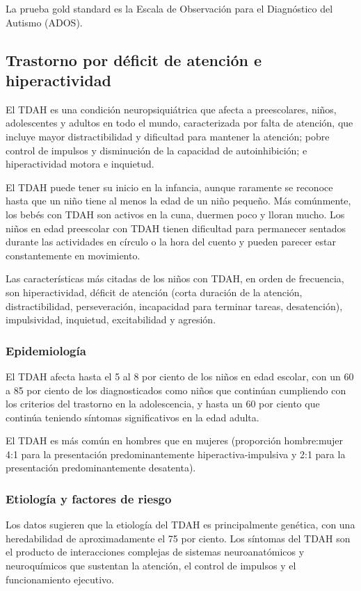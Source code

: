 \documentclass[11pt,letterpaper]{report}
\begin{document}
La prueba gold standard es la Escala de Observación para el Diagnóstico del
Autismo (ADOS). \cite{Koth2023}

\subsection{Trastorno por déficit de atención e hiperactividad}
El TDAH es una condición neuropsiquiátrica que afecta a preescolares, niños,
adolescentes y adultos en todo el mundo, caracterizada por falta de atención,
que incluye mayor distractibilidad y dificultad para mantener la atención;
pobre control de impulsos y disminución de la capacidad de autoinhibición; e
hiperactividad motora e inquietud. \cite{Boland2021-by, Nelson50}

El TDAH puede tener su inicio en la infancia, aunque raramente se reconoce
hasta que un niño tiene al menos la edad de un niño pequeño. Más comúnmente,
los bebés con TDAH son activos en la cuna, duermen poco y lloran mucho. Los
niños en edad preescolar con TDAH tienen dificultad para permanecer sentados
durante las actividades en círculo o la hora del cuento y pueden parecer estar
constantemente en movimiento.

Las características más citadas de los niños con TDAH, en orden de frecuencia,
son hiperactividad, déficit de atención (corta duración de la atención,
distractibilidad, perseveración, incapacidad para terminar tareas,
desatención), impulsividad, inquietud, excitabilidad y agresión.
\cite{Boland2021-by}

\subsubsection{Epidemiología}
El TDAH afecta hasta el 5 al 8 por ciento de los niños en edad escolar, con un
60 a 85 por ciento de los diagnosticados como niños que continúan cumpliendo
con los criterios del trastorno en la adolescencia, y hasta un 60 por ciento
que continúa teniendo síntomas significativos en la edad adulta.
\cite{Boland2021-by}

El TDAH es más común en hombres que en mujeres (proporción hombre:mujer 4:1
para la presentación predominantemente hiperactiva-impulsiva y 2:1 para la
presentación predominantemente desatenta). \cite{ADHDUpToDate}

\subsubsection{Etiología y factores de riesgo}
Los datos sugieren que la etiología del TDAH es principalmente genética, con
una heredabilidad de aproximadamente el 75 por ciento. Los síntomas del TDAH
son el producto de interacciones complejas de sistemas neuroanatómicos y
neuroquímicos que sustentan la atención, el control de impulsos y el
funcionamiento ejecutivo. \cite{Boland2021-by}
\end{document}

